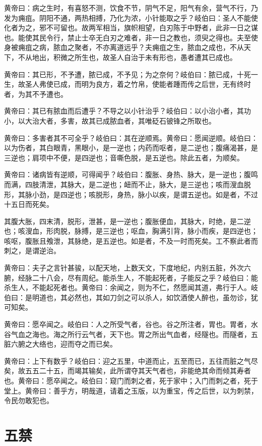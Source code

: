 \documentclass[12pt,UTF8]{ctexbook}
\begin{document}
	黄帝曰：病之生时，有喜怒不测，饮食不节，阴气不足，阳气有余，营气不行，乃发为痈疽。阴阳不通，两热相搏，乃化为浓，小针能取之乎？岐伯曰：圣人不能使化者为之，邪不可留也。故两军相当，旗帜相望，白刃陈于中野者，此非一日之谋也。能使其民令行，禁止士卒无白刃之难者，非一日之教也，须臾之得也。夫至使身被痈疽之病，脓血之聚者，不亦离道远乎？夫痈疽之生，脓血之成也，不从天下，不从地出，积微之所生也，故圣人自治于未有形也，愚者遭其已成也。
	
	黄帝曰：其已形，不予遭，脓已成，不予见；为之奈何？岐伯曰：脓已成，十死一生，故圣人弗使已成，而明为良方，着之竹帛，使能者踵而传之后世，无有终时者，为其不予遭也。
	
	黄帝曰：其已有脓血而后遭乎？不导之以小针治乎？岐伯曰：以小治小者，其功小，以大治大者，多害，故其已成脓血者，其唯砭石铍锋之所取也。
	
	黄帝曰：多害者其不可全乎？岐伯曰：其在逆顺焉。黄帝曰：愿闻逆顺。岐伯曰：以为伤者，其白眼青，黑眼小，是一逆也；内药而呕者，是二逆也；腹痛渴甚，是三逆也；肩项中不便，是四逆也；音嘶色脱，是五逆也。除此五者，为顺矣。
	
	黄帝曰：诸病皆有逆顺，可得闻乎？岐伯曰：腹胀、身热、脉大，是一逆也；腹鸣而满，四肢清泄，其脉大，是二逆也；衄而不止，脉大，是三逆也；咳而溲血脱形，其脉小劲，是四逆也；咳脱形，身热，脉小以疾，是谓五逆也。如是者，不过十五日而死矣。
	
	其腹大胀，四末清，脱形，泄甚，是一逆也；腹胀便血，其脉大，时绝，是二逆也；咳溲血，形肉脱，脉搏，是三逆也；呕血，胸满引背，脉小而疾，是四逆也；咳呕，腹胀且飧泄，其脉绝，是五逆也。如是者，不及一时而死矣。工不察此者而刺之，是谓逆治。
	
	黄帝曰：夫子之言针甚骏，以配天地，上数天文，下度地纪，内别五脏，外次六腑，经脉二十八会，尽有周纪。能杀生人，不能起死者，子能反之乎？岐伯曰：能杀生人，不能起死者也。黄帝曰：余闻之，则为不仁，然愿闻其道，弗行于人。岐伯曰：是明道也，其必然也，其如刀剑之可以杀人，如饮酒使人醉也，虽勿诊，犹可知矣。
	
	黄帝曰：愿卒闻之。岐伯曰：人之所受气者，谷也。谷之所注者，胃也。胃者，水谷气血之海也。海之所行云气者，天下也。胃之所出气血者，经隧也。而隧者，五脏六腑之大络也，迎而夺之而已矣。
	
	黄帝曰：上下有数乎？岐伯曰：迎之五里，中道而止，五至而已，五往而脏之气尽矣，故五五二十五，而竭其输矣，此所谓夺其天气者也，非能绝其命而倾其寿者也。黄帝曰：愿卒闻之。岐伯曰：窥门而刺之者，死于家中；入门而刺之者，死于堂上。黄帝曰：善乎方，明哉道，请着之玉版，以为重宝，传之后世，以为刺禁，令民勿敢犯也。
	\chapter{五禁}
	
\end{document}
